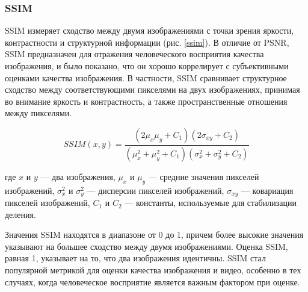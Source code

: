\subsubsection{SSIM}\label{sect-4-3-2}

SSIM измеряет сходство между двумя изображениями с точки зрения яркости, контрастности и структурной информации (рис. \ref{ssim}). В отличие от PSNR, SSIM предназначен для отражения человеческого восприятия качества изображения, и было показано, что он хорошо коррелирует с субъективными оценками качества изображения. В частности, SSIM сравнивает структурное сходство между соответствующими пикселями на двух изображениях, принимая во внимание яркость и контрастность, а также пространственные отношения между пикселями.

\begin{equation}
    \label{eq:1-3-2}
    SSIM(x,y) = \frac{(2\mu_x\mu_y + C_1)(2\sigma_{xy} + C_2)}{(\mu_x^2 + \mu_y^2 + C_1)(\sigma_x^2 + \sigma_y^2 + C_2)}
\end{equation}

где $x$ и $y$ — два изображения, $\mu_x$ и $\mu_y$ — средние значения пикселей изображений, $\sigma_x^2$ и $\sigma_y^2$ — дисперсии пикселей изображений, $\sigma_{xy}$ — ковариация пикселей изображений, $C_1$ и $C_2$ — константы, используемые для стабилизации деления.


Значения SSIM находятся в диапазоне от 0 до 1, причем более высокие значения указывают на большее сходство между двумя изображениями. Оценка SSIM, равная 1, указывает на то, что два изображения идентичны. SSIM стал популярной метрикой для оценки качества изображения и видео, особенно в тех случаях, когда человеческое восприятие является важным фактором при оценке.
